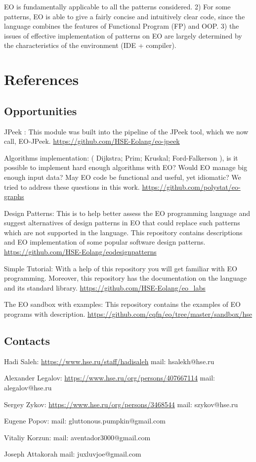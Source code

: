 \documentclass[12pt]{book}
\begin{document}
EO is fundamentally applicable to all the patterns considered. 2) For some patterns, EO is able to give a fairly concise and intuitively clear code, since the language combines the features of Functional Program (FP) and OOP. 3) the issues of effective implementation of patterns on EO are largely determined by the characteristics of the environment (IDE + compiler).

\chapter{References}
\section{Opportunities}
JPeek : This module was built into the pipeline of the JPeek tool, which we now call, EO-JPeek.
\url{https://github.com/HSE-Eolang/eo-jpeek}

Algorithms implementation: ( Dijkstra; Prim; Kruskal; Ford-Falkerson ), is it possible to implement hard enough algorithms with EO? Would EO manage big enough input data? May EO code be functional and useful, yet idiomatic? We tried to address these questions in this work.
\url{https://github.com/polystat/eo-graphs}

Design Patterns: This is to help better assess the EO programming language and suggest alternatives of design patterns in EO that could replace such patterns which are not supported in the language. This repository contains descriptions and EO implementation of some popular software design patterns.
\url{https://github.com/HSE-Eolang/eodesignpatterns}

Simple Tutorial: With a help of this repository you will get familiar with EO programming. Moreover, this repository has the documentation on the language and its standard library.
\url{https://github.com/HSE-Eolang/eo_labs}


The EO sandbox with examples: This repository contains the examples of EO programs with description.
\url{https://github.com/cqfn/eo/tree/master/sandbox/hse}

\section{Contacts}
Hadi Saleh: 
\url{https://www.hse.ru/staff/hadisaleh}
mail: hsalekh@hse.ru


Alexander Legalov:
\url{https://www.hse.ru/org/persons/407667114}
mail: alegalov@hse.ru


Sergey Zykov:
\url{https://www.hse.ru/org/persons/3468544}
mail: szykov@hse.ru

Eugene Popov:
mail: gluttonous.pumpkin@gmail.com

Vitaliy Korzun:
mail: aventador3000@gmail.com

Joseph Attakorah 
mail: juxluvjoe@gmail.com
\end{document}
